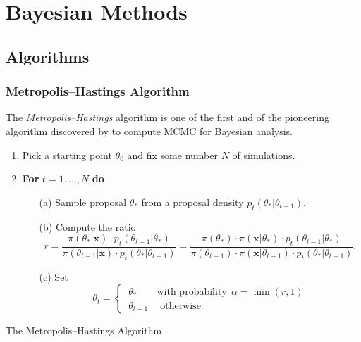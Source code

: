 \documentclass[11pt,a4paper,openany ]{book}
\begin{document}
\chapter{Bayesian Methods}\label{appB}

\section{Algorithms}

\subsection{Metropolis–Hastings Algorithm}

The \emph{Metropolis–Hastings} algorithm is one of the first and of the pioneering algorithm discovered by \cite{hastings_monte_1970} to compute  MCMC for Bayesian analysis.

\begin{algorithm}[H]
	\SetAlgoLined
	\begin{enumerate}
		\item Pick a starting point $\theta_0$ and fix some number $N$ of simulations.
		\item \textbf{For} $t=1,\dots,N$ \quad \textbf{do}
		\begin{itemize}
			\item[(a)] Sample proposal $\theta_*$ from a proposal density $p_t(\theta_*|\theta_{t-1})$,
			\item[(b)] Compute the ratio
			\begin{equation*}
			r = \frac{\pi(\theta_*|\boldsymbol{x})\cdot p_t(\theta_{t-1}|\theta_*)}{\pi(\theta_{t-1}|\boldsymbol{x})\cdot p_t(\theta_*|\theta_{t-1})} = \frac{\pi(\theta_*)\cdot \pi(\boldsymbol{x}|\theta_*)\cdot p_t(\theta_{t-1}|\theta_*)}{\pi(\theta_{t-1})\cdot \pi(\boldsymbol{x}|\theta_{t-1})\cdot p_t(\theta_*|\theta_{t-1})}.
			\end{equation*}
			\item[(c)] Set 
			\begin{equation*}
			\theta_t= 			\begin{cases} \ \theta_* \qquad \text{with probability} \ \  \alpha=\min (r,1) \\
			\ \theta_{t-1} \ \quad \text{otherwise}.
			\end{cases}
			\end{equation*}
		\end{itemize}
	\end{enumerate}
	\caption{The Metropolis–Hastings Algorithm}
\end{algorithm}
\end{document}
